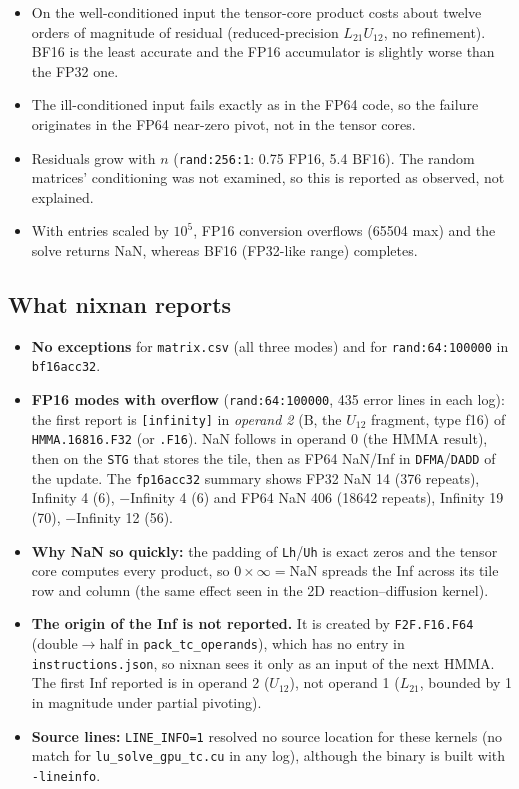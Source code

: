 \documentclass[11pt,a4paper]{article}
\begin{document}
\begin{itemize}
  \item On the well-conditioned input the tensor-core product costs about
    twelve orders of magnitude of residual (reduced-precision $L_{21}U_{12}$,
    no refinement). BF16 is the least accurate and the FP16 accumulator is
    slightly worse than the FP32 one.
  \item The ill-conditioned input fails exactly as in the FP64 code, so the
    failure originates in the FP64 near-zero pivot, not in the tensor cores.
  \item Residuals grow with $n$ (\texttt{rand:256:1}: 0.75 FP16, 5.4 BF16).
    The random matrices' conditioning was not examined, so this is reported
    as observed, not explained.
  \item With entries scaled by $10^5$, FP16 conversion overflows (65504 max)
    and the solve returns NaN, whereas BF16 (FP32-like range) completes.
\end{itemize}

\subsection{What nixnan reports}

\begin{itemize}
  \item \textbf{No exceptions} for \texttt{matrix.csv} (all three modes) and
    for \texttt{rand:64:100000} in \texttt{bf16acc32}.
  \item \textbf{FP16 modes with overflow} (\texttt{rand:64:100000}, 435 error
    lines in each log): the first report is \texttt{[infinity]} in
    \emph{operand 2} (B, the $U_{12}$ fragment, type f16) of
    \texttt{HMMA.16816.F32} (or \texttt{.F16}). NaN follows in operand 0 (the
    HMMA result), then on the \texttt{STG} that stores the tile, then as FP64
    NaN/Inf in \texttt{DFMA}/\texttt{DADD} of the update. The
    \texttt{fp16acc32} summary shows FP32 NaN 14 (376 repeats), Infinity 4
    (6), $-$Infinity 4 (6) and FP64 NaN 406 (18642 repeats), Infinity 19
    (70), $-$Infinity 12 (56).
  \item \textbf{Why NaN so quickly:} the padding of \texttt{Lh}/\texttt{Uh} is
    exact zeros and the tensor core computes every product, so
    $0\times\infty=\mathrm{NaN}$ spreads the Inf across its tile row and
    column (the same effect seen in the 2D reaction--diffusion kernel).
  \item \textbf{The origin of the Inf is not reported.} It is created by
    \texttt{F2F.F16.F64} (double$\to$half in \texttt{pack\_tc\_operands}),
    which has no entry in \texttt{instructions.json}, so nixnan sees it only
    as an input of the next HMMA. The first Inf reported is in operand 2
    ($U_{12}$), not operand 1 ($L_{21}$, bounded by 1 in magnitude under
    partial pivoting).
  \item \textbf{Source lines:} \texttt{LINE\_INFO=1} resolved no source
    location for these kernels (no match for \texttt{lu\_solve\_\allowbreak gpu\_tc.cu}
    in any log), although the binary is built with \texttt{-lineinfo}.
\end{itemize}
\end{document}
